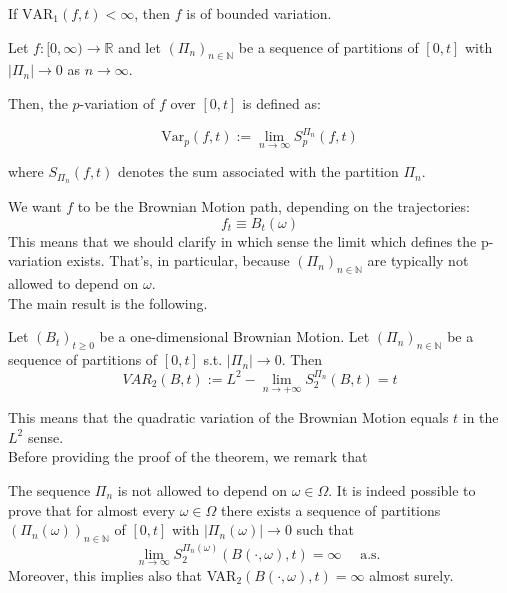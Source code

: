 \begin{remark}
    If $\text{VAR}_1(f,t) < \infty$, then $f$ is of bounded variation.  
\end{remark}

\begin{DefBox}
    \begin{Def}[$p$-variation]
    Let \( f \colon [0, \infty) \to \mathbb{R} \) and let \( (\Pi_n)_{n \in \mathbb{N}} \) be a sequence of partitions of \([0, t]\) with \( |\Pi_n| \to 0 \) as \( n \to \infty \). 

Then, the \(p\)-variation of \(f\) over \([0,t]\) is defined as:

\[
\text{Var}_p(f, t) := \lim_{n \to \infty} S_p^{\Pi_n}(f, t)
\]

where \( S_{\Pi_n}(f, t) \) denotes the sum associated with the partition \(\Pi_n\).
\end{Def}
\end{DefBox}
We want $f$ to be the Brownian Motion path, depending on the trajectories:
\begin{equation*}
        f_t \equiv B_t(\omega)   
\end{equation*}
This means that we should clarify in which sense the limit which defines the p-variation exists. That's, in particular, because $(\Pi_n)_{n \in \mathbb{N}}$ are typically not allowed to depend on $\omega$.       \\
The main result is the following.
\begin{ThBox}
    \begin{Th}
    Let $(B_t)_{t \geq 0}$ be a one-dimensional Brownian Motion. Let $(\Pi_n)_{n \in \mathbb{N}}$ be a sequence of partitions of $[0,t]$ s.t. $|\Pi_n| \rightarrow 0$. Then
    \begin{equation*}
        VAR_2(B,t) := L^2-\lim_{n \rightarrow +\infty} S_2^{\Pi_n}(B,t) = t
    \end{equation*}
\end{Th}
\end{ThBox}
This means that the quadratic variation of the Brownian Motion equals $t$ in the $L^2$ sense. \\
Before providing the proof of the theorem, we remark that
\begin{remark}
    The sequence $\Pi_n$ is not allowed to depend on $\omega \in \Omega$. It is indeed possible to prove that for almost every $\omega \in \Omega$ there exists a sequence of partitions $(\Pi_n(\omega))_{n \in \mathbb{N}}$ of $[0,t]$ with $|\Pi_n(\omega)|\rightarrow 0$ such that
    \begin{equation*}
        \lim_{n \rightarrow \infty} S_2^{\Pi_n(\omega)}(B(\cdot, \omega), t) = \infty \quad \text{ a.s. }
    \end{equation*}
    Moreover, this implies also that VAR$_2(B(\cdot, \omega), t) = \infty$ almost surely. 
\end{remark}
